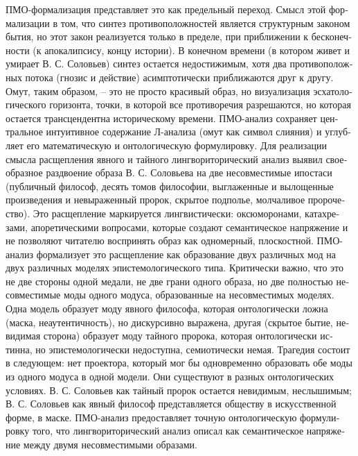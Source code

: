 \begin{russian}
    ПМО-формализация представляет это как предельный переход. Смысл этой формализации в том, что синтез противоположностей является структурным законом бытия, но этот закон реализуется только в пределе, при приближении к бесконечности (к апокалипсису, концу истории). В конечном времени (в котором живет и умирает В. С. Соловьев) синтез остается недостижимым, хотя два противоположных потока (гнозис и действие) асимптотически приближаются друг к другу.
    Омут, таким образом, – это не просто красивый образ, но визуализация эсхатологического горизонта, точки, в которой все противоречия разрешаются, но которая остается трансцендентна историческому времени. ПМО-анализ сохраняет центральное интуитивное содержание Л-анализа (омут как символ слияния) и углубляет его математическую и онтологическую формулировку.
    Для реализации смысла расщепления явного и тайного лингвориторический анализ выявил своеобразное раздвоение образа В. С. Соловьева на две несовместимые ипостаси (публичный философ, десять томов философии, выглаженные и вылощенные произведения и невыраженный пророк, скрытое подполье, молчаливое пророчество). Это расщепление маркируется лингвистически: оксюморонами, катахрезами, апоретическими вопросами, которые создают семантическое напряжение и не позволяют читателю воспринять образ как одномерный, плоскостной.
    ПМО-анализ формализует это расщепление как образование двух различных мод на двух различных моделях эпистемологического типа. 
    Критически важно, что это не две стороны одной медали, не две грани одного образа, но две полностью несовместимые моды одного модуса, образованные на несовместимых моделях. Одна модель образует моду явного философа, которая онтологически ложна (маска, неаутентичность), но дискурсивно выражена, другая (скрытое бытие, невидимая сторона) образует моду тайного пророка, которая онтологически истинна, но эпистемологически недоступна, семиотически немая.
    Трагедия состоит в следующем: нет проектора, который мог бы одновременно образовать обе моды из одного модуса в одной модели. Они существуют в разных онтологических условиях. В. С. Соловьев как тайный пророк остается невидимым, неслышимым; В. С. Соловьев как явный философ представляется обществу в искусственной форме, в маске.
    ПМО-анализ предоставляет точную онтологическую формулировку того, что лингвориторический анализ описал как семантическое напряжение между двумя несовместимыми образами.


\end{russian}
